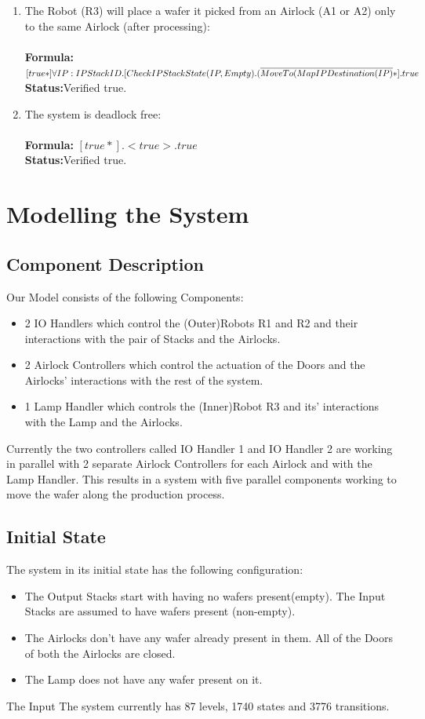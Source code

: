 \documentclass[a4paper,12pt]{article}
\begin{document}
\begin{enumerate}
		\item The Robot (R3) will place a wafer it picked from an Airlock (A1 or A2) only to the same Airlock (after processing):
		\\
		\\\textbf{Formula:} $[true*] \forall IP: IPStackID.[CheckIPStackState(IP, Empty).
		\\(\overline{MoveTo(MapIPDestination(IP)}*].true$ \\\textbf{Status:}Verified true.
		
		\item The system is deadlock free:
		\\
		\\\textbf{Formula:} $[true*].<true>.true$
		\\\textbf{Status:}Verified true.
		
	\end{enumerate}
	
	\newpage
	\section{Modelling the System}
	\subsection{Component Description}
	Our Model consists of the following Components:
	\begin{itemize}
		\item 2 IO Handlers which control the (Outer)Robots R1 and R2 and their interactions with the pair of Stacks and the Airlocks.
		\item 2 Airlock Controllers which control the actuation of the Doors and the Airlocks' interactions with the rest of the system.
		\item 1 Lamp Handler which controls the (Inner)Robot R3 and its' interactions with the Lamp and the Airlocks.
	\end{itemize}
	Currently the two controllers called IO Handler 1 and IO Handler 2 are working in parallel with 2 separate Airlock Controllers for each Airlock and with the Lamp Handler. This results in a system with five parallel components working to move the wafer along the production process. 
	\subsection{Initial State}
	The system in its initial state has the following configuration:
	\begin{itemize}
		\item The Output Stacks start with having no wafers present(empty). The Input Stacks are assumed to have wafers present (non-empty).
		\item The Airlocks don't have any wafer already present in them. All of the Doors of both the Airlocks are closed.
		\item The Lamp does not have any wafer present on it.
	\end{itemize} 
	The Input The system currently has 87 levels, 1740 states and 3776 transitions.
\end{document}
